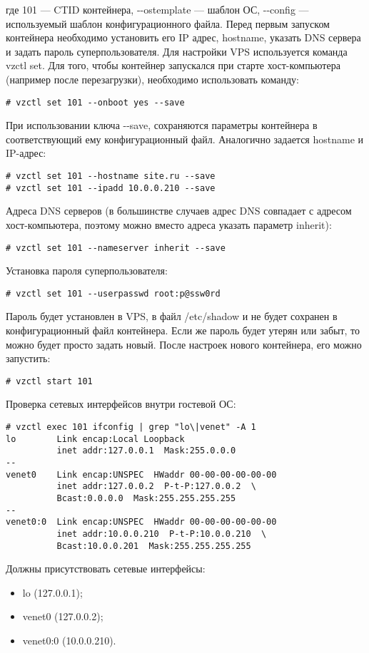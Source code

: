 где 101 --- CTID контейнера, -{}-ostemplate --- шаблон ОС, -{}-config --- используемый шаблон конфигурационного файла.
Перед первым запуском контейнера необходимо установить его IP адрес, hostname, указать DNS сервера и задать пароль суперпользователя.
Для настройки VPS используется команда vzctl set.
Для того, чтобы контейнер запускался при старте хост-компьютера (например после перезагрузки), необходимо использовать команду:
\begin{lstlisting}
# vzctl set 101 --onboot yes --save
\end{lstlisting}
При использовании ключа -{}-save, сохраняются параметры контейнера в соответствующий ему конфигурационный файл.
Аналогично задается hostname и IP-адрес:
\begin{lstlisting}
# vzctl set 101 --hostname site.ru --save
# vzctl set 101 --ipadd 10.0.0.210 --save
\end{lstlisting}
Адреса DNS серверов (в большинстве случаев адрес DNS совпадает с адресом хост-компьютера, поэтому можно вместо адреса указать параметр inherit):
\begin{lstlisting}
# vzctl set 101 --nameserver inherit --save
\end{lstlisting}
Установка пароля суперпользователя:
\begin{lstlisting}
# vzctl set 101 --userpasswd root:p@ssw0rd
\end{lstlisting}
Пароль будет установлен в VPS, в файл /etc/shadow и не будет сохранен в конфигурационный файл контейнера.
Если же пароль будет утерян или забыт, то можно будет просто задать новый.
После настроек нового контейнера, его можно запустить:
\begin{lstlisting}
# vzctl start 101
\end{lstlisting}
Проверка сетевых интерфейсов внутри гостевой ОС:
\begin{lstlisting}
# vzctl exec 101 ifconfig | grep "lo\|venet" -A 1
lo        Link encap:Local Loopback
          inet addr:127.0.0.1  Mask:255.0.0.0
--
venet0    Link encap:UNSPEC  HWaddr 00-00-00-00-00-00
          inet addr:127.0.0.2  P-t-P:127.0.0.2  \
          Bcast:0.0.0.0  Mask:255.255.255.255
--
venet0:0  Link encap:UNSPEC  HWaddr 00-00-00-00-00-00
          inet addr:10.0.0.210  P-t-P:10.0.0.210  \
          Bcast:10.0.0.201  Mask:255.255.255.255
\end{lstlisting}
Должны присутствовать сетевые интерфейсы:
\begin{itemize}
    \item lo (127.0.0.1);
    \item venet0 (127.0.0.2);
    \item venet0:0 (10.0.0.210).
\end{itemize}
